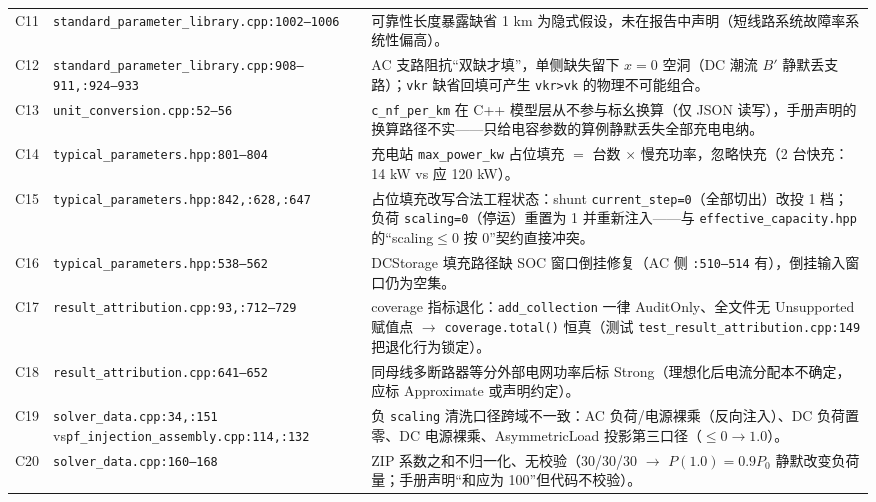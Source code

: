 \documentclass[11pt,a4paper,fontset=fandol]{ctexart}
\newcommand{\file}[1]{\texttt{#1}}
\begin{document}
\begin{footnotesize}
\begin{longtable}{@{}p{0.7cm}p{5.2cm}p{9.3cm}@{}}
C11 & \file{standard\_parameter\_library.cpp:}\newline\file{1002--1006} & 可靠性长度暴露缺省 1 km 为隐式假设，未在报告中声明（短线路系统故障率系统性偏高）。\\
C12 & \file{standard\_parameter\_library.cpp:}\newline\file{908--911,:924--933} & AC 支路阻抗``双缺才填''，单侧缺失留下 $x=0$ 空洞（DC 潮流 $B'$ 静默丢支路）；\texttt{vkr} 缺省回填可产生 \texttt{vkr>vk} 的物理不可能组合。\\
C13 & \file{unit\_conversion.cpp:52--56} & \texttt{c\_nf\_per\_km} 在 C++ 模型层从不参与标幺换算（仅 JSON 读写），手册声明的换算路径不实——只给电容参数的算例静默丢失全部充电电纳。\\
C14 & \file{typical\_parameters.hpp:801--804} & 充电站 \texttt{max\_power\_kw} 占位填充 $=$ 台数 $\times$ 慢充功率，忽略快充（2 台快充：14 kW vs 应 120 kW）。\\
C15 & \file{typical\_parameters.hpp:842,}\newline\file{:628,:647} & 占位填充改写合法工程状态：shunt \texttt{current\_step=0}（全部切出）改投 1 档；负荷 \texttt{scaling=0}（停运）重置为 1 并重新注入——与 \file{effective\_capacity.hpp} 的``scaling$\le$0 按 0''契约直接冲突。\\
C16 & \file{typical\_parameters.hpp:538--562} & DCStorage 填充路径缺 SOC 窗口倒挂修复（AC 侧 \file{:510--514} 有），倒挂输入窗口仍为空集。\\
C17 & \file{result\_attribution.cpp:}\newline\file{93,:712--729} & coverage 指标退化：\texttt{add\_collection} 一律 AuditOnly、全文件无 Unsupported 赋值点 $\to$ \texttt{coverage.total()} 恒真（测试 \file{test\_result\_attribution.cpp:149} 把退化行为锁定）。\\
C18 & \file{result\_attribution.cpp:641--652} & 同母线多断路器等分外部电网功率后标 Strong（理想化后电流分配本不确定，应标 Approximate 或声明约定）。\\
C19 & \file{solver\_data.cpp:34,:151} vs\newline\file{pf\_injection\_assembly.cpp:}\newline\file{114,:132} & 负 \texttt{scaling} 清洗口径跨域不一致：AC 负荷/电源裸乘（反向注入）、DC 负荷置零、DC 电源裸乘、AsymmetricLoad 投影第三口径（$\le 0 \to 1.0$）。\\
C20 & \file{solver\_data.cpp:160--168} & ZIP 系数之和不归一化、无校验（30/30/30 $\to$ $P(1.0)=0.9P_0$ 静默改变负荷量；手册声明``和应为 100''但代码不校验）。\\
\bottomrule
\end{longtable}
\end{footnotesize}
\end{document}
